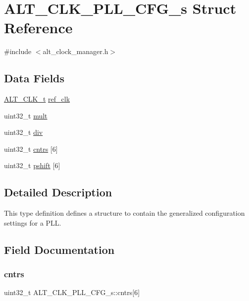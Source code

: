 \hypertarget{structALT__CLK__PLL__CFG__s}{}\section{A\+L\+T\+\_\+\+C\+L\+K\+\_\+\+P\+L\+L\+\_\+\+C\+F\+G\+\_\+s Struct Reference}
\label{structALT__CLK__PLL__CFG__s}


{\ttfamily \#include $<$alt\+\_\+clock\+\_\+manager.\+h$>$}

\subsection*{Data Fields}
\begin{DoxyCompactItemize}
\item 
\mbox{\hyperlink{group__CLK__MGR_ga4cdb80e84284365fe3d47c2f8050b13d}{A\+L\+T\+\_\+\+C\+L\+K\+\_\+t}} \mbox{\hyperlink{structALT__CLK__PLL__CFG__s_abd8e872e3e1a626d376f4fd689c01f85}{ref\+\_\+clk}}
\item 
uint32\+\_\+t \mbox{\hyperlink{structALT__CLK__PLL__CFG__s_a07ae3f01764da8dda3ee5c64a084a178}{mult}}
\item 
uint32\+\_\+t \mbox{\hyperlink{structALT__CLK__PLL__CFG__s_a574ab0d09cac840c00da844e64f47ec9}{div}}
\item 
uint32\+\_\+t \mbox{\hyperlink{structALT__CLK__PLL__CFG__s_a0250ba9403a43bdba5463b1f3f476466}{cntrs}} \mbox{[}6\mbox{]}
\item 
uint32\+\_\+t \mbox{\hyperlink{structALT__CLK__PLL__CFG__s_a07022afe293b77cd14d621dd0a789fb6}{pshift}} \mbox{[}6\mbox{]}
\end{DoxyCompactItemize}


\subsection{Detailed Description}
This type definition defines a structure to contain the generalized configuration settings for a P\+LL. 

\subsection{Field Documentation}
\mbox{\label{structALT__CLK__PLL__CFG__s_a0250ba9403a43bdba5463b1f3f476466}} 
\subsubsection{\texorpdfstring{cntrs}{cntrs}}
{\footnotesize\ttfamily uint32\+\_\+t A\+L\+T\+\_\+\+C\+L\+K\+\_\+\+P\+L\+L\+\_\+\+C\+F\+G\+\_\+s\+::cntrs\mbox{[}6\mbox{]}}

